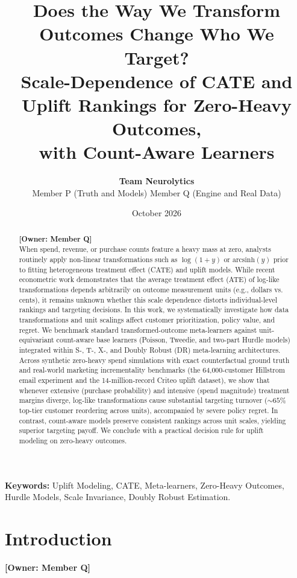 \documentclass[11pt,a4paper]{article}
\title{\textbf{Does the Way We Transform Outcomes Change Who We Target?}\\
\large Scale-Dependence of CATE and Uplift Rankings for Zero-Heavy Outcomes,\\
with Count-Aware Learners}
\author{
    \textbf{Team Neurolytics}\\
    Member P (Truth and Models) \quad Member Q (Engine and Real Data)
}
\date{October 2026}
\begin{document}
\maketitle

\begin{abstract}
\noindent \textbf{[Owner: Member Q]} \\
When spend, revenue, or purchase counts feature a heavy mass at zero, analysts routinely apply non-linear transformations such as $\log(1+y)$ or $\text{arcsinh}(y)$ prior to fitting heterogeneous treatment effect (CATE) and uplift models. While recent econometric work demonstrates that the average treatment effect (ATE) of log-like transformations depends arbitrarily on outcome measurement units (e.g., dollars vs. cents), it remains unknown whether this scale dependence distorts individual-level rankings and targeting decisions. In this work, we systematically investigate how data transformations and unit scalings affect customer prioritization, policy value, and regret. We benchmark standard transformed-outcome meta-learners against unit-equivariant count-aware base learners (Poisson, Tweedie, and two-part Hurdle models) integrated within S-, T-, X-, and Doubly Robust (DR) meta-learning architectures. Across synthetic zero-heavy spend simulations with exact counterfactual ground truth and real-world marketing incrementality benchmarks (the 64,000-customer Hillstrom email experiment and the 14-million-record Criteo uplift dataset), we show that whenever extensive (purchase probability) and intensive (spend magnitude) treatment margins diverge, log-like transformations cause substantial targeting turnover ($\sim 65\%$ top-tier customer reordering across units), accompanied by severe policy regret. In contrast, count-aware models preserve consistent rankings across unit scales, yielding superior targeting payoff. We conclude with a practical decision rule for uplift modeling on zero-heavy outcomes.
\end{abstract}

\vspace{1em}
\noindent \textbf{Keywords:} Uplift Modeling, CATE, Meta-learners, Zero-Heavy Outcomes, Hurdle Models, Scale Invariance, Doubly Robust Estimation.

\newpage

\section{Introduction}
\label{sec:intro}
\noindent \textbf{[Owner: Member Q]}
\end{document}
